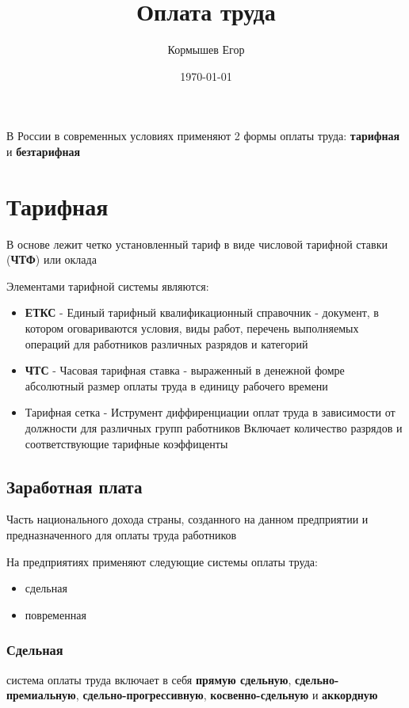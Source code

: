 \documentclass[11pt]{article}
\author{Кормышев Егор}
\date{\today}
\title{Оплата труда}
\begin{document}
\maketitle
\tableofcontents

В России в современных условиях применяют 2 формы оплаты труда: \textbf{тарифная} и \textbf{безтарифная}

\section{Тарифная}
\label{sec:org38eced8}

В основе лежит четко установленный тариф в виде числовой тарифной ставки (\textbf{ЧТФ}) или оклада

Элементами тарифной системы являются:

\begin{itemize}
\item \textbf{ЕТКС} - Единый тарифный квалификационный справочник - документ, в котором оговариваются условия, виды работ, перечень выполняемых операций для работников различных разрядов и категорий
\item \textbf{ЧТС} - Часовая тарифная ставка - выраженный в денежной фомре абсолютный размер оплаты труда в единицу рабочего времени
\item Тарифная сетка - Иструмент диффиренциации оплат труда в зависимости от должности для различных групп работников \newline Включает количество разрядов и соответствующие тарифные коэффиценты
\end{itemize}

\subsection{Заработная плата}
\label{sec:orgef06399}

Часть национального дохода страны, созданного на данном предприятии и предназначенного для оплаты труда работников

На предприятиях применяют следующие системы оплаты труда:

\begin{itemize}
\item сдельная
\item повременная
\end{itemize}

\subsubsection{Сдельная}
\label{sec:org9f91b05}
система оплаты труда включает в себя \textbf{прямую сдельную}, \textbf{сдельно-премиальную}, \textbf{сдельно-прогрессивную}, \textbf{косвенно-сдельную} и \textbf{аккордную}
\end{document}
